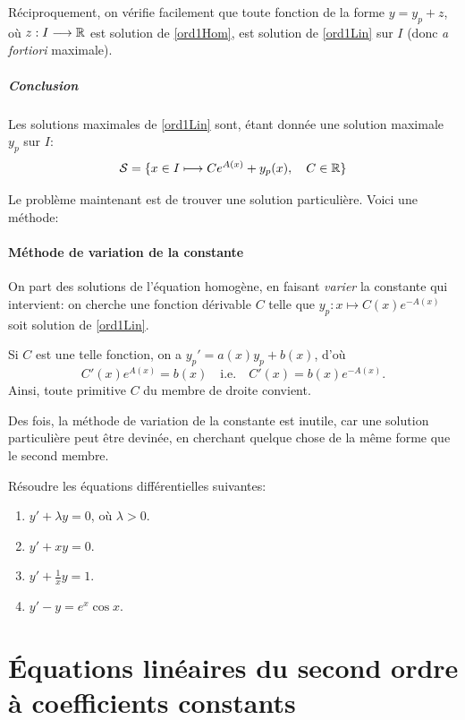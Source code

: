 \documentclass[../main.tex]{subfiles}
\begin{document}
Réciproquement, on vérifie facilement que toute fonction de la forme $y=y_p+z$, où $z:I\longrightarrow\mathbb R$ est solution de \eqref{ord1Hom}, est solution de \eqref{ord1Lin} sur $I$ (donc \textit{a fortiori} maximale).

\subparagraph{Conclusion} Les solutions maximales de \eqref{ord1Lin} sont, étant donnée une solution maximale $y_p$ sur $I$:
\[
\mathcal{S} = \{x\in I\longmapsto Ce^{A(x)} + y_p(x),\quad C\in\mathbb R\}
\]


Le problème maintenant est de trouver une solution particulière. Voici une méthode:

\paragraph{Méthode de variation de la constante} On part des solutions de l'équation homogène, en faisant \textit{varier} la constante qui intervient: on cherche une fonction dérivable $C$ telle que $y_p:x\longmapsto C(x)e^{-A(x)}$ soit solution de \eqref{ord1Lin}.

Si $C$ est une telle fonction, on a $y_p' = a(x)y_p + b(x)$, d'où
	\[
	C'(x)e^{A(x)} 
	= b(x)\quad 
	\textrm{i.e.}\quad
	C'(x) = b(x)e^{-A(x)}.
	\]
Ainsi, toute primitive $C$ du membre de droite convient.

\begin{rem}
	Des fois, la méthode de variation de la constante est inutile, car une solution particulière peut être devinée, en cherchant quelque chose de la même forme que le second membre.
\end{rem}

\begin{exo}
	Résoudre les équations différentielles suivantes:
	\begin{multicols}{2}
	\begin{enumerate}
		\item $y' + \lambda y=0$, où $\lambda>0$.
		\item $y' + xy = 0$.
		\item $y' + \frac{1}{x}y = 1$.
		\item $y' - y = e^x\cos x$.
	\end{enumerate}
\end{multicols}
\end{exo}

\section{Équations linéaires du second ordre à coefficients constants}
\end{document}
